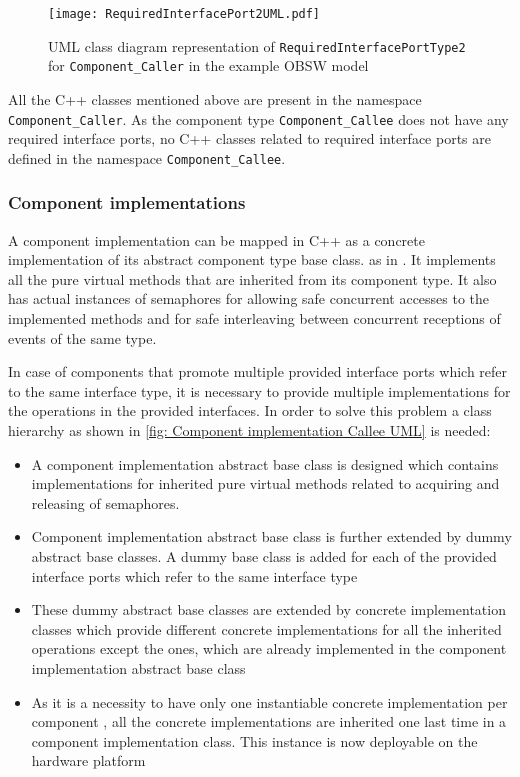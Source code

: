 \begin{figure}[h]
	\centering
	\texttt{[image: RequiredInterfacePort2UML.pdf]}
	\caption{UML class diagram representation of \texttt{Required\allowbreak InterfacePort\allowbreak Type2} for \texttt{Component\allowbreak\_Caller} in the example OBSW model}
	\label{fig: Required interface port2 UML}
\end{figure}

All the C++ classes mentioned above are present in the namespace \texttt{Component\allowbreak\_Caller}. As the component type \texttt{Component\allowbreak\_Callee} does not have any required interface ports, no C++ classes related to required interface ports are defined in the namespace \texttt{Component\allowbreak\_Callee}. 

\subsubsection{\textbf{Component implementations}}
A component implementation can be mapped in C++ as a concrete implementation of its abstract component type base class. as in \cite{EvoRAVCodeAr}. It implements all the pure virtual methods that are inherited from its component type. It also has actual instances of semaphores for allowing safe concurrent accesses to the implemented methods and for safe interleaving between concurrent receptions of events of the same type.

In case of components that promote multiple provided interface ports which refer to the same interface type, it is necessary to provide multiple implementations for the operations in the provided interfaces. In order to solve this problem a class hierarchy as shown in \cref{fig: Component implementation Callee UML} is needed:

\begin{itemize}
\item A component implementation abstract base class is designed which contains implementations for inherited pure virtual methods related to acquiring and releasing of semaphores.
\item Component implementation abstract base class is further extended by dummy abstract base classes. A dummy base class is added for each of the provided interface ports which refer to the same interface type
\item These dummy abstract base classes are extended by concrete implementation classes which provide different concrete implementations for all the inherited operations except the ones, which are already implemented in the component implementation abstract base class
\item As it is a necessity to have only one instantiable concrete implementation per component \cite{EvoRAVCodeAr,SpecMetamodel,CompBasedProcess}, all the concrete implementations are inherited one last time in a component implementation class. This instance is now deployable on the hardware platform
\end{itemize}
 
